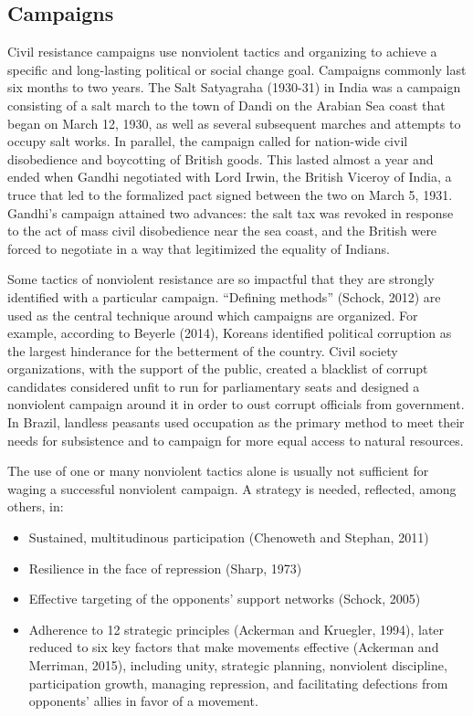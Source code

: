 \documentclass[twoside,a4paper,12pt,fleqn,openany]{extbook}
\begin{document}
\subsection*{Campaigns}

Civil resistance campaigns use nonviolent tactics and organizing to achieve a specific and long-lasting political or social change goal. Campaigns commonly last six months to two years. The Salt Satyagraha (1930-31) in India was a campaign consisting of a salt march to the town of Dandi on the Arabian Sea coast that began on March 12, 1930, as well as several subsequent marches and attempts to occupy salt works. In parallel, the campaign called for nation-wide civil disobedience and boycotting of British goods. This lasted almost a year and ended when Gandhi negotiated with Lord Irwin, the British Viceroy of India, a truce that led to the formalized pact signed between the two on March 5, 1931. Gandhi’s campaign attained two advances: the salt tax was revoked in response to the act of mass civil disobedience near the sea coast, and the British were forced to negotiate in a way that legitimized the equality of Indians.

Some tactics of nonviolent resistance are so impactful that they are strongly identified with a particular campaign. “Defining methods” (Schock, 2012) are used as the central technique around which campaigns are organized. For example, according to Beyerle (2014), Koreans identified political corruption as the largest hinderance for the betterment of the country. Civil society organizations, with the support of the public, created a blacklist of corrupt candidates considered unfit to run for parliamentary seats and designed a nonviolent campaign around it in order to oust corrupt officials from government. In Brazil, landless peasants used occupation as the primary method to meet their needs for subsistence and to campaign for more equal access to natural resources.

The use of one or many nonviolent tactics alone is usually not sufficient for waging a successful nonviolent campaign. A strategy is needed, reflected, among others, in:

\begin{itemize}
\item Sustained, multitudinous participation (Chenoweth and Stephan, 2011)
\item Resilience in the face of repression (Sharp, 1973)
\item Effective targeting of the opponents’ support networks (Schock, 2005)
\item Adherence to 12 strategic principles (Ackerman and Kruegler, 1994), later reduced to six key factors that make movements effective (Ackerman and Merriman, 2015), including unity, strategic planning, nonviolent discipline, participation growth, managing repression, and facilitating defections from opponents’ allies in favor of a movement.
\end{itemize}
\end{document}
